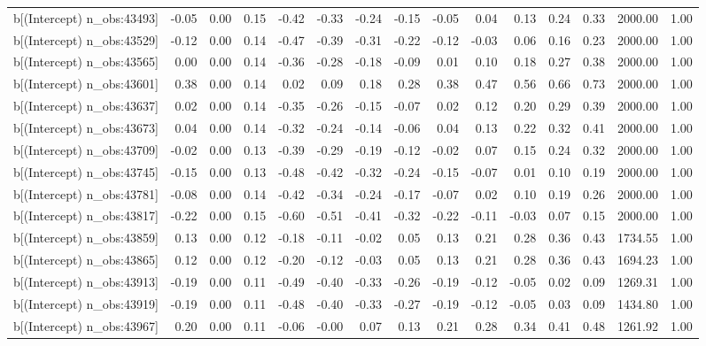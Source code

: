 \begin{table}[ht]
\begin{tabular}{rrrrrrrrrrrrrrr}
  b[(Intercept) n\_obs:43493] & -0.05 & 0.00 & 0.15 & -0.42 & -0.33 & -0.24 & -0.15 & -0.05 & 0.04 & 0.13 & 0.24 & 0.33 & 2000.00 & 1.00 \\ 
  b[(Intercept) n\_obs:43529] & -0.12 & 0.00 & 0.14 & -0.47 & -0.39 & -0.31 & -0.22 & -0.12 & -0.03 & 0.06 & 0.16 & 0.23 & 2000.00 & 1.00 \\ 
  b[(Intercept) n\_obs:43565] & 0.00 & 0.00 & 0.14 & -0.36 & -0.28 & -0.18 & -0.09 & 0.01 & 0.10 & 0.18 & 0.27 & 0.38 & 2000.00 & 1.00 \\ 
  b[(Intercept) n\_obs:43601] & 0.38 & 0.00 & 0.14 & 0.02 & 0.09 & 0.18 & 0.28 & 0.38 & 0.47 & 0.56 & 0.66 & 0.73 & 2000.00 & 1.00 \\ 
  b[(Intercept) n\_obs:43637] & 0.02 & 0.00 & 0.14 & -0.35 & -0.26 & -0.15 & -0.07 & 0.02 & 0.12 & 0.20 & 0.29 & 0.39 & 2000.00 & 1.00 \\ 
  b[(Intercept) n\_obs:43673] & 0.04 & 0.00 & 0.14 & -0.32 & -0.24 & -0.14 & -0.06 & 0.04 & 0.13 & 0.22 & 0.32 & 0.41 & 2000.00 & 1.00 \\ 
  b[(Intercept) n\_obs:43709] & -0.02 & 0.00 & 0.13 & -0.39 & -0.29 & -0.19 & -0.12 & -0.02 & 0.07 & 0.15 & 0.24 & 0.32 & 2000.00 & 1.00 \\ 
  b[(Intercept) n\_obs:43745] & -0.15 & 0.00 & 0.13 & -0.48 & -0.42 & -0.32 & -0.24 & -0.15 & -0.07 & 0.01 & 0.10 & 0.19 & 2000.00 & 1.00 \\ 
  b[(Intercept) n\_obs:43781] & -0.08 & 0.00 & 0.14 & -0.42 & -0.34 & -0.24 & -0.17 & -0.07 & 0.02 & 0.10 & 0.19 & 0.26 & 2000.00 & 1.00 \\ 
  b[(Intercept) n\_obs:43817] & -0.22 & 0.00 & 0.15 & -0.60 & -0.51 & -0.41 & -0.32 & -0.22 & -0.11 & -0.03 & 0.07 & 0.15 & 2000.00 & 1.00 \\ 
  b[(Intercept) n\_obs:43859] & 0.13 & 0.00 & 0.12 & -0.18 & -0.11 & -0.02 & 0.05 & 0.13 & 0.21 & 0.28 & 0.36 & 0.43 & 1734.55 & 1.00 \\ 
  b[(Intercept) n\_obs:43865] & 0.12 & 0.00 & 0.12 & -0.20 & -0.12 & -0.03 & 0.05 & 0.13 & 0.21 & 0.28 & 0.36 & 0.43 & 1694.23 & 1.00 \\ 
  b[(Intercept) n\_obs:43913] & -0.19 & 0.00 & 0.11 & -0.49 & -0.40 & -0.33 & -0.26 & -0.19 & -0.12 & -0.05 & 0.02 & 0.09 & 1269.31 & 1.00 \\ 
  b[(Intercept) n\_obs:43919] & -0.19 & 0.00 & 0.11 & -0.48 & -0.40 & -0.33 & -0.27 & -0.19 & -0.12 & -0.05 & 0.03 & 0.09 & 1434.80 & 1.00 \\ 
  b[(Intercept) n\_obs:43967] & 0.20 & 0.00 & 0.11 & -0.06 & -0.00 & 0.07 & 0.13 & 0.21 & 0.28 & 0.34 & 0.41 & 0.48 & 1261.92 & 1.00 \\ 

\end{tabular}
\end{table}
